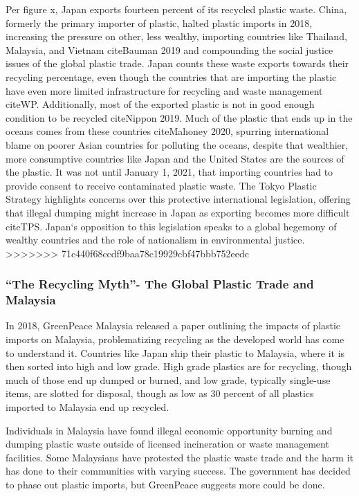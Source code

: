 \documentclass{book}\usepackage{knitr}
\begin{document}
Per figure x, Japan exports fourteen percent of its recycled plastic waste. China, formerly the primary importer of plastic, halted plastic imports in 2018, increasing the pressure on other, less wealthy, importing countries like Thailand, Malaysia, and Vietnam citeBauman 2019 and compounding the social justice issues of the global plastic trade. Japan counts these waste exports towards their recycling percentage, even though the countries that are importing the plastic have even more limited infrastructure for recycling and waste management citeWP. Additionally, most of the exported plastic is not in good enough condition to be recycled citeNippon 2019. Much of the plastic that ends up in the oceans comes from these countries citeMahoney 2020, spurring international blame on poorer Asian countries for polluting the oceans, despite that wealthier, more consumptive countries like Japan and the United States are the sources of the plastic. It was not until January 1, 2021, that importing countries had to provide consent to receive contaminated plastic waste. The Tokyo Plastic Strategy highlights concerns over this protective international legislation, offering that illegal dumping might increase in Japan as exporting becomes more difficult citeTPS. Japan`s opposition to this legislation speaks to a global hegemony of wealthy countries and the role of nationalism in environmental justice. 
>>>>>>> 71c440f68ccdf9baa78c19929cbf47bbb752eedc

\subsubsection{``The Recycling Myth''- The Global Plastic Trade and Malaysia}

In 2018, GreenPeace Malaysia released a paper outlining the impacts of plastic imports on Malaysia, problematizing recycling as the developed world has come to understand it. Countries like Japan ship their plastic to Malaysia, where it is then sorted into high and low grade. High grade plastics are for recycling, though much of those end up dumped or burned, and low grade, typically single-use items, are slotted for disposal, though as low as 30 percent of all plastics imported to Malaysia end up recycled.

Individuals in Malaysia have found illegal economic opportunity burning and dumping plastic waste outside of licensed incineration or waste management facilities. Some Malaysians have protested the plastic waste trade and the harm it has done to their communities with varying success. The government has decided to phase out plastic imports, but GreenPeace suggests more could be done. 
\end{document}
